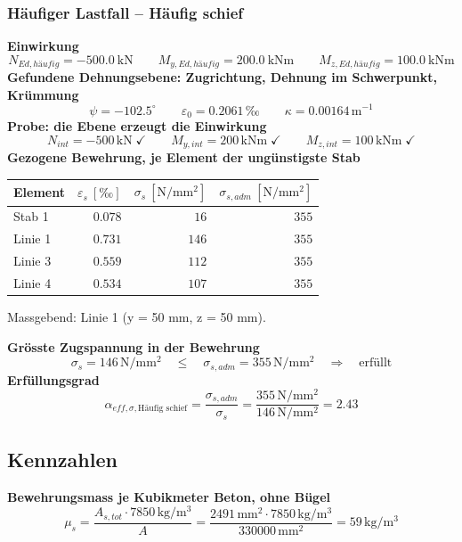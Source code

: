 \documentclass[11pt,a4paper]{article}
\begin{document}
\subsubsection{Häufiger Lastfall – Häufig schief}
\noindent\textbf{Einwirkung}
\begin{equation*}
N_{Ed,häufig} = -500.0\ \mathrm{kN} \qquad M_{y,Ed,häufig} = 200.0\ \mathrm{kNm} \qquad M_{z,Ed,häufig} = 100.0\ \mathrm{kNm}
\end{equation*}
\noindent\textbf{Gefundene Dehnungsebene: Zugrichtung, Dehnung im Schwerpunkt, Krümmung}
\begin{equation*}
\psi = -102.5^\circ \qquad \varepsilon_0 = 0.2061\,\text{‰} \qquad \kappa = 0.00164\,\mathrm{m}^{-1}
\end{equation*}
\noindent\textbf{Probe: die Ebene erzeugt die Einwirkung}
\begin{equation*}
N_{int} = -500\,\mathrm{kN} \;\checkmark \qquad M_{y,int} = 200\,\mathrm{kNm} \;\checkmark \qquad M_{z,int} = 100\,\mathrm{kNm} \;\checkmark
\end{equation*}
\noindent\textbf{Gezogene Bewehrung, je Element der ungünstigste Stab}
\begin{longtable}{lrrr}
\hline
Element & $\varepsilon_s\ [‰]$ & $\sigma_s\ [\mathrm{N/mm^2}]$ & $\sigma_{s,adm}\ [\mathrm{N/mm^2}]$ \\
\hline
\endhead
Stab 1 & $0.078$ & $16$ & $355$ \\
Linie 1 & $0.731$ & $146$ & $355$ \\
Linie 3 & $0.559$ & $112$ & $355$ \\
Linie 4 & $0.534$ & $107$ & $355$ \\
\hline
\end{longtable}
Massgebend: Linie 1 (y = 50 mm, z = 50 mm).

\noindent\textbf{Grösste Zugspannung in der Bewehrung}
\begin{equation*}
\sigma_s = 146\,\mathrm{N}/\mathrm{mm}^{2} \quad \le \quad \sigma_{s,adm} = 355\,\mathrm{N}/\mathrm{mm}^{2} \quad \Rightarrow \quad \text{erfüllt}
\end{equation*}
\noindent\textbf{Erfüllungsgrad}
\begin{equation*}
\alpha_{eff,\sigma,\text{Häufig schief}} = \frac{\sigma_{s,adm}}{\sigma_s} = \frac{355\,\mathrm{N}/\mathrm{mm}^{2}}{146\,\mathrm{N}/\mathrm{mm}^{2}} = 2.43
\end{equation*}
\subsection{Kennzahlen}
\noindent\textbf{Bewehrungsmass je Kubikmeter Beton, ohne Bügel}
\begin{equation*}
\mu_s = \frac{A_{s,tot} \cdot 7850\,\mathrm{kg}/\mathrm{m}^{3}}{A} = \frac{2491\,\mathrm{mm}^{2} \cdot 7850\,\mathrm{kg}/\mathrm{m}^{3}}{330000\,\mathrm{mm}^{2}} = 59\,\mathrm{kg}/\mathrm{m}^{3}
\end{equation*}
\end{document}
